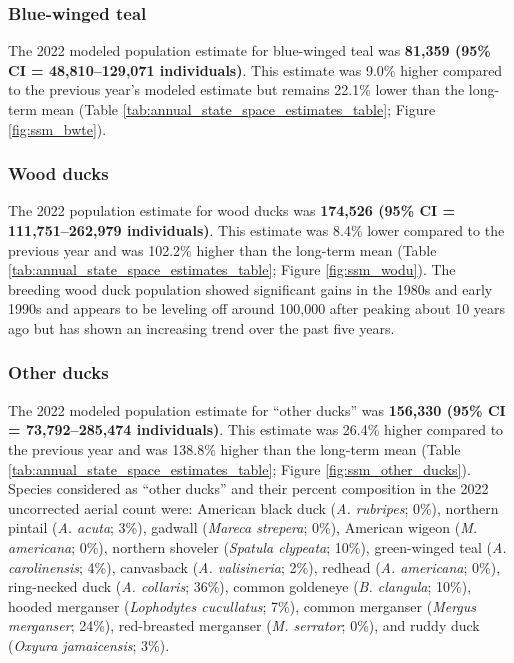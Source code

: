 \documentclass[
  12pt,
]{article}
\begin{document}
\hypertarget{blue-winged-teal}{%
\subsubsection{Blue-winged teal}\label{blue-winged-teal}}

The 2022 modeled population estimate for blue-winged teal was
\textbf{81,359 (95\% CI = 48,810--129,071 individuals)}. This estimate
was 9.0\% higher compared to the previous year's modeled estimate but
remains 22.1\% lower than the long-term mean (Table
\ref{tab:annual_state_space_estimates_table}; Figure
\ref{fig:ssm_bwte}).

\hypertarget{wood-ducks}{%
\subsubsection{Wood ducks}\label{wood-ducks}}

The 2022 population estimate for wood ducks was \textbf{174,526 (95\% CI
= 111,751--262,979 individuals)}. This estimate was 8.4\% lower compared
to the previous year and was 102.2\% higher than the long-term mean
(Table \ref{tab:annual_state_space_estimates_table}; Figure
\ref{fig:ssm_wodu}). The breeding wood duck population showed
significant gains in the 1980s and early 1990s and appears to be
leveling off around 100,000 after peaking about 10 years ago but has
shown an increasing trend over the past five years.

\hypertarget{other-ducks}{%
\subsubsection{Other ducks}\label{other-ducks}}

The 2022 modeled population estimate for ``other ducks'' was
\textbf{156,330 (95\% CI = 73,792--285,474 individuals)}. This estimate
was 26.4\% higher compared to the previous year and was 138.8\% higher
than the long-term mean (Table
\ref{tab:annual_state_space_estimates_table}; Figure
\ref{fig:ssm_other_ducks}). Species considered as ``other ducks'' and
their percent composition in the 2022 uncorrected aerial count were:
American black duck (\emph{A. rubripes}; 0\%), northern pintail
(\emph{A. acuta}; 3\%), gadwall (\emph{Mareca strepera}; 0\%), American
wigeon (\emph{M. americana}; 0\%), northern shoveler (\emph{Spatula
clypeata}; 10\%), green-winged teal (\emph{A. carolinensis}; 4\%),
canvasback (\emph{A. valisineria}; 2\%), redhead (\emph{A. americana};
0\%), ring-necked duck (\emph{A. collaris}; 36\%), common goldeneye
(\emph{B. clangula}; 10\%), hooded merganser (\emph{Lophodytes
cucullatus}; 7\%), common merganser (\emph{Mergus merganser}; 24\%),
red-breasted merganser (\emph{M. serrator}; 0\%), and ruddy duck
(\emph{Oxyura jamaicensis}; 3\%).
\end{document}
